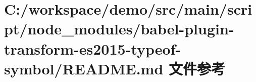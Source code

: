 \hypertarget{node__modules_2babel-plugin-transform-es2015-typeof-symbol_2_r_e_a_d_m_e_8md}{}\section{C\+:/workspace/demo/src/main/script/node\+\_\+modules/babel-\/plugin-\/transform-\/es2015-\/typeof-\/symbol/\+R\+E\+A\+D\+ME.md 文件参考}
\label{node__modules_2babel-plugin-transform-es2015-typeof-symbol_2_r_e_a_d_m_e_8md}

